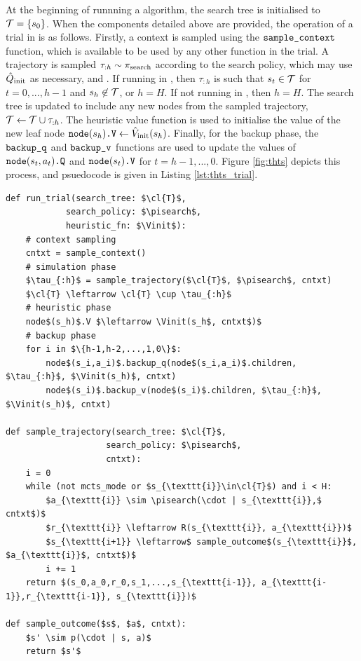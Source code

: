         At the beginning of runnning a \thtspp\ewe algorithm, the search tree is initialised to $\mathcal{T}=\{s_0\}$. When the components detailed above are provided, the operation of a trial in \thtspp\ewe is as follows. Firstly, a context is sampled using the ${\textnormal{\texttt{sample\_context}}}$ function, which is available to be used by any other function in the trial. A trajectory is sampled $\tau_{:h}\sim{\pi_{\textnormal{search}}}$ according to the search policy, which may use ${\hat{Q}_{\textnormal{init}}}$ as necessary, and \sampleoutcome. If running in \mctsmode, then $\tau_{:h}$ is such that $s_t\in\mathcal{T}$ for $t=0,...,h-1$ and $s_h\not\in\mathcal{T}$, or $h=H$. If not running in \mctsmode, then $h=H$. The search tree is updated to include any new nodes from the sampled trajectory, $\mathcal{T}\leftarrow\mathcal{T}\cup\tau_{:h}$. The heuristic value function is used to initialise the value of the new leaf node ${{\textnormal{\texttt{node}}}(s_h)\textnormal{\texttt{.V}}}\leftarrow {\hat{V}_{\textnormal{init}}}(s_h)$. Finally, for the backup phase, the ${\textnormal{\texttt{backup\_q}}}$ and ${\textnormal{\texttt{backup\_v}}}$ functions are used to update the values of ${{\textnormal{\texttt{node}}}(s_t,a_t)\textnormal{\texttt{.Q}}}$ and ${{\textnormal{\texttt{node}}}(s_t)\textnormal{\texttt{.V}}}$ for $t=h-1,...,0$. Figure \ref{fig:thts} depicts this process, and psuedocode is given in Listing \ref{lst:thts_trial}.
        
        \begin{Listing}
            \begin{lstlisting}
def run_trial(search_tree: $\cl{T}$, 
            search_policy: $\pisearch$, 
            heuristic_fn: $\Vinit$):
    # context sampling
    cntxt = sample_context()
    # simulation phase
    $\tau_{:h}$ = sample_trajectory($\cl{T}$, $\pisearch$, cntxt)
    $\cl{T} \leftarrow \cl{T} \cup \tau_{:h}$
    # heuristic phase
    node$(s_h)$.V $\leftarrow \Vinit(s_h$, cntxt$)$
    # backup phase
    for i in $\{h-1,h-2,...,1,0\}$:
        node$(s_i,a_i)$.backup_q(node$(s_i,a_i)$.children, $\tau_{:h}$, $\Vinit(s_h)$, cntxt)
        node$(s_i)$.backup_v(node$(s_i)$.children, $\tau_{:h}$, $\Vinit(s_h)$, cntxt)

def sample_trajectory(search_tree: $\cl{T}$, 
                    search_policy: $\pisearch$, 
                    cntxt):
    i = 0
    while (not mcts_mode or $s_{\texttt{i}}\in\cl{T}$) and i < H:
        $a_{\texttt{i}} \sim \pisearch(\cdot | s_{\texttt{i}},$ cntxt$)$ 
        $r_{\texttt{i}} \leftarrow R(s_{\texttt{i}}, a_{\texttt{i}})$
        $s_{\texttt{i+1}} \leftarrow$ sample_outcome$(s_{\texttt{i}}$, $a_{\texttt{i}}$, cntxt$)$
        i += 1
    return $(s_0,a_0,r_0,s_1,...,s_{\texttt{i-1}}, a_{\texttt{i-1}},r_{\texttt{i-1}}, s_{\texttt{i}})$

def sample_outcome($s$, $a$, cntxt):
    $s' \sim p(\cdot | s, a)$
    return $s'$
            \end{lstlisting}
            \caption[Psuedocode for running a trial in \thtspp.]{Psuedocode for running a trial in \thtspp.}
            \label{lst:thts_trial}
        \end{Listing}



